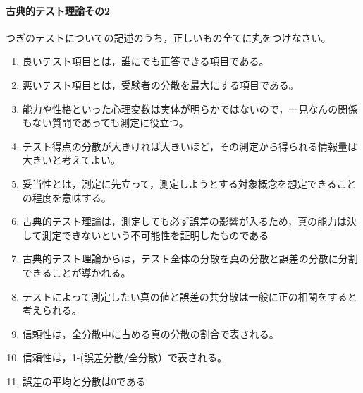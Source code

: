 \documentclass{ltjbook}
\begin{document}
\paragraph{古典的テスト理論その2}つぎのテストについての記述のうち，正しいもの全てに丸をつけなさい。
\begin{enumerate}
    \item 良いテスト項目とは，誰にでも正答できる項目である。
    \item 悪いテスト項目とは，受験者の分散を最大にする項目である。
    \item 能力や性格といった心理変数は実体が明らかではないので，一見なんの関係もない質問であっても測定に役立つ。
    \item テスト得点の分散が大きければ大きいほど，その測定から得られる情報量は大きいと考えてよい。
    \item 妥当性とは，測定に先立って，測定しようとする対象概念を想定できることの程度を意味する。
    \item 古典的テスト理論は，測定しても必ず誤差の影響が入るため，真の能力は決して測定できないという不可能性を証明したものである
    \item 古典的テスト理論からは，テスト全体の分散を真の分散と誤差の分散に分割できることが導かれる。
    \item テストによって測定したい真の値と誤差の共分散は一般に正の相関をすると考えられる。
    \item 信頼性は，全分散中に占める真の分散の割合で表される。
    \item 信頼性は，1-(誤差分散/全分散）で表される。
    \item 誤差の平均と分散は0である
\end{enumerate}
\end{document}
